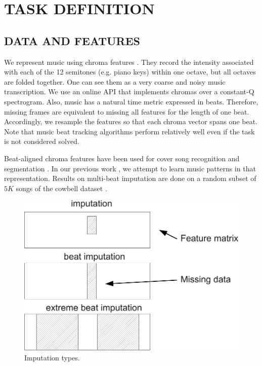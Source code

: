 \documentclass{article}
\begin{document}
\section{TASK DEFINITION}
\label{sec:task}

\subsection{DATA AND FEATURES}
\label{ssec:feats}
We represent music using chroma features \cite{Ellis2007a}. They
record the intensity associated with each of the 12 semitones
(e.g. piano keys) within one octave, but all octaves are folded
together. One can see them as a very coarse and noisy music
transcription. We use an online API \cite{EchoNest} that implements
chromas over a constant-Q spectrogram.  Also, music has a natural time
metric expressed in beats. Therefore, missing frames are equivalent to
missing all features for the length of one beat. Accordingly, we
resample the features so that each chroma vector spans one beat. Note
that music beat tracking algorithms perform relatively well
\cite{Davies2007} even if the task is not considered solved.

Beat-aligned chroma features have been used for cover song recognition
\cite{Ellis2007a} and segmentation \cite{Weiss2010}. In our previous work
\cite{Bertin-Mahieux2010a}, we attempt to learn music patterns in that
representation. Results on multi-beat imputation are done on a random
subset of $5K$ songs of the cowbell dataset
\cite{Bertin-Mahieux2010a}.


\begin{figure}[t]
\begin{center}
\includegraphics[width=.7\columnwidth]{type_imputation}
\end{center}
\caption{Imputation types.
\label{fig:types}}
\end{figure}
\end{document}
